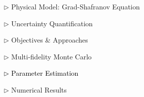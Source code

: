 \documentclass{beamer}
\begin{document}
\begin{frame}[c]
\large 	
\textcolor{mygray1}{
    \begin{itemize}[leftmargin=5pt] 
        \item[$\triangleright$]  Physical Model: Grad-Shafranov Equation
        \vspace{0.2cm}	
        \item[$\triangleright$] Uncertainty Quantification
        \vspace{0.2cm}
        \item[$\triangleright$]  Objectives \& Approaches
        \vspace{0.2cm}
        \item[$\triangleright$] Multi-fidelity Monte Carlo
        \vspace{0.2cm}
        \item[\textcolor{black}{$\triangleright$}] \textcolor{black}{\fontsize{25}{60}\selectfont Parameter Estimation}
        \vspace{0.2cm}
        \item[$\triangleright$] Numerical Results
    \end{itemize}
}
\end{frame}
\end{document}
